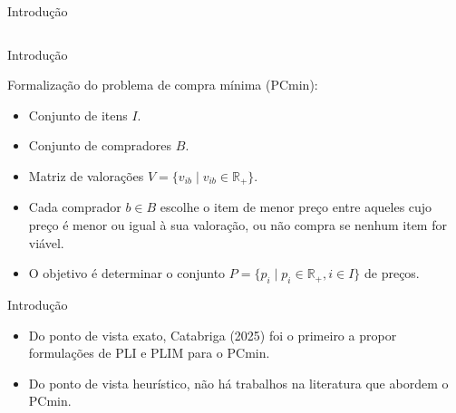 \documentclass{beamer}
\begin{document}
\begin{frame}{Introdução}

    \begin{columns}

        \centering
        \conjuntoItensValorados
        \vspace*{6mm}
        \pause

        \centering
        \conjuntoItensPrecificados

    \end{columns}

\end{frame}

\begin{frame}{Introdução}

    Formalização do problema de compra mínima (PCmin):
    \begin{itemize}
        \item Conjunto de itens $I$.
        \pause
        \item Conjunto de compradores $B$.
        \pause
        \item Matriz de valorações $V = \{v_{ib} \mid v_{ib} \in \mathbb{R}_+\}$.
        \pause
        \item Cada comprador $b \in B$ escolhe o item de menor preço entre aqueles cujo preço é menor ou igual à sua valoração, ou não compra se nenhum item for viável.
        \pause
        \item O objetivo é determinar o conjunto $P = \{p_i \mid p_i \in \mathbb{R}_+, i \in I\} $ de preços.
    \end{itemize}

\end{frame}

\begin{frame}{Introdução}

    \begin{itemize}
        \item Do ponto de vista exato, Catabriga (2025) foi o primeiro a propor formulações de PLI e PLIM para o PCmin.
        \pause
        \item Do ponto de vista heurístico, não há trabalhos na literatura que abordem o PCmin.
    \end{itemize}

\end{frame}
\end{document}
